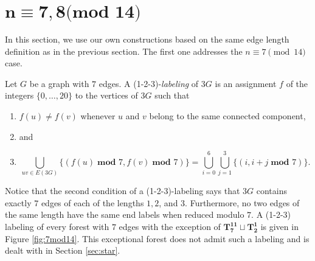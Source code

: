 \chapter{$\mathbf{n\equiv 7,8\textbf{(mod 14)}}$}

In this section, we use our own constructions based on the same edge length definition as in the previous section. The first one addresses the $n \equiv 7 \pmod{14}$ case.

\begin{definition}\label{def:1-2-3}
    Let $G$ be a graph with $7$ edges. A (1-2-3)-\emph{labeling} of $3G$ is an assignment $f$ of the integers $\{0,\dots,20\}$ to the vertices of $3G$ such that
    \begin{enumerate}
        \item $f(u) \neq f(v)$ whenever $u$ and $v$ belong to the same connected component, 
        \item[] and
        \item $$ \bigcup_{uv\in E(3G)} \{(f(u)\; \textbf{mod } 7,f(v)\; \textbf{mod } 7)\}= \bigcup_{i=0}^{6} \bigcup_{j=1}^{3} \{(i,i+j \; \textbf{mod } 7)\}.$$
    \end{enumerate}
\end{definition}
Notice that the second condition of a (1-2-3)-labeling says that $3G$ contains exactly $7$ edges of each of the lengths $1,2$, and $3$. Furthermore, no two edges of the same length have the same end labels when reduced modulo $7.$ A (1-2-3) labeling of every forest with $7$ edges with the exception of $\mathbf{T_{7}^{11}}\sqcup\mathbf{T_{2}^{1}}$ is given in Figure \ref{fig:7mod14}. This exceptional forest does not admit such a labeling and is dealt with in Section \ref{sec:star}.

